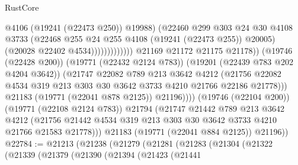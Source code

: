 \begin{lexlean}{RustCore}
\begin{coremodule}
                                                @4106
                                                (@19241 (@22473 @250))
                                                @19988)
                                              (@22460
                                                @299
                                                @303
                                                @24
                                                @30
                                                @4108
                                                @3733
                                                (@22468
                                                  @255
                                                  @24
                                                  @255
                                                  @4108
                                                  (@19241 (@22473 @255))
                                                  @20005)
                                                (@20028 @22402 @4534)))))))))))))
                        @21169
                        @21172
                        @21175
                        @21178))
                    (@19746 (@22428 @200))
                    (@19771 (@22432 @2124 @783))
                    (@19201 (@22439 @783 @202 @4204 @3642))
                    (@21747
                      @22082
                      @789
                      @213
                      @3642
                      @4212
                      (@21756
                        @22082
                        @4534
                        @319
                        @213
                        @303
                        @30
                        @3642
                        @3733
                        @4210
                        @21766
                        @22186
                        @21778)))
                  @21183
                  (@19771 (@22041 @878 @2125))
                  @21196))))
          (@19746 (@22104 @200))
          (@19771 (@22108 @2124 @783))
          @21794
          (@21747
            @21442
            @789
            @213
            @3642
            @4212
            (@21756 @21442 @4534 @319 @213 @303 @30 @3642 @3733 @4210 @21766 @21583 @21778)))
        @21183
        (@19771 (@22041 @884 @2125))
        @21196))
@22784 := @21213
    (@21238
      (@21279
        (@21281
          (@21283
            (@21304
              (@21322
                (@21339
                  (@21379
                    (@21390
                      (@21394
                        (@21423
                          (@21441

\end{coremodule}
\end{lexlean}
